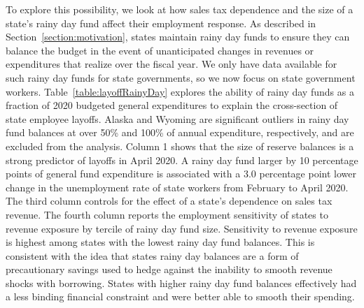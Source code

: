 
To explore this possibility, we look at how sales tax dependence and the size of a state's rainy day fund affect their employment response.  As described in Section~\ref{section:motivation}, states maintain rainy day funds to ensure they can balance the budget in the event of unanticipated changes in revenues or expenditures that realize over the fiscal year. We only have data available for such rainy day funds for state governments, so we now focus on state government workers. Table~\ref{table:layoffRainyDay} explores the ability of rainy day funds as a fraction of 2020 budgeted general expenditures to explain the cross-section of state employee layoffs. Alaska and Wyoming are significant outliers in rainy day fund balances at over 50\% and 100\% of annual expenditure, respectively, and are excluded from the analysis. Column 1 shows that the size of reserve balances is a strong predictor of layoffs in April 2020. A rainy day fund larger by 10 percentage points of general fund expenditure is associated with a 3.0 percentage point lower change in the unemployment rate of state workers from February to April 2020. The third column controls for the effect of a state's dependence on sales tax revenue. The fourth column reports the employment sensitivity of states to revenue exposure by tercile of rainy day fund size. Sensitivity to revenue exposure is highest among states with the lowest rainy day fund balances. This is consistent with the idea that states rainy day balances are a form of precautionary savings used to hedge against the inability to smooth revenue shocks with borrowing. States with higher rainy day fund balances effectively had a less binding financial constraint and were better able to smooth their spending. 

